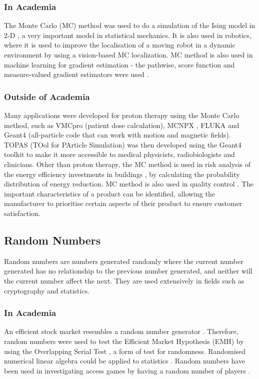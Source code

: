 \documentclass[10pt, twocolumn]{article}
\begin{document}
\subsubsection{In Academia} %
The Monte Carlo (MC) method was used to do a simulation of the Ising model in 2-D \cite{Shekaari2021}\cite{Jindal2007}, a very important model in statistical mechanics. It is also used in robotics, where it is used to improve the localisation of a moving robot in a dynamic environment \cite{Zhao2008} by using a vision-based MC localization. MC method is also used in machine learning for gradient estimation - the pathwise, score function and measure-valued gradient estimators were used \cite{Mohamed2020}.

\subsubsection{Outside of Academia} %
Many applications were developed for proton therapy using the Monte Carlo method, such as VMCpro \cite{FippelSoukup2004} (patient dose calculation), MCNPX \cite{Waters2002}, FLUKA \cite{Ferrari2005} and Geant4 \cite{Geant4} \cite{Geant4_2} (all-particle code that can work with motion and magnetic fields). TOPAS (TOol for PArticle Simulation) \cite{Perl2012}\cite{Faddegon2020} was then developed using the Geant4 toolkit to make it more accessible to medical physicists, radiobiologists and clinicians. Other than proton therapy, the MC method is used in risk analysis of the energy efficiency investments in buildings \cite{Togashi2019}, by calculating the probability distribution of energy reduction. MC method is also used in quality control \cite{Moran2023}. The important characteristics of a product can be identified, allowing the manufacturer to prioritise certain aspects of their product to ensure customer satisfaction.

\subsection{Random Numbers} %
Random numbers are numbers generated randomly where the current number generated has no relationship to the previous number generated, and neither will the current number affect the next. They are used extensively in fields such as cryptography and statistics.

\subsubsection{In Academia}
An efficient stock market resembles a random number generator \cite{Doyle2013}. Therefore, random numbers were used to test the Efficient Market Hypothesis (EMH) \cite{Yen2008} by using the Overlapping Serial Test \cite{Good1953}, a form of test for randomness. Randomised numerical linear algebra \cite{Martinsson2020} could be applied to statistics \cite{Gentle2012}. Random numbers have been used in investigating access games by having a random number of players \cite{Tembine2008}.
\end{document}
